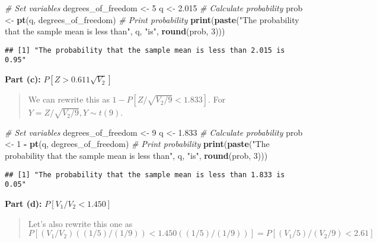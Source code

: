 \documentclass[
]{article}
\newenvironment{Shaded}{\begin{snugshade}}{\end{snugshade}}
\newcommand{\CommentTok}[1]{\textcolor[rgb]{0.56,0.35,0.01}{\textit{#1}}}
\newcommand{\DecValTok}[1]{\textcolor[rgb]{0.00,0.00,0.81}{#1}}
\newcommand{\FloatTok}[1]{\textcolor[rgb]{0.00,0.00,0.81}{#1}}
\newcommand{\FunctionTok}[1]{\textcolor[rgb]{0.13,0.29,0.53}{\textbf{#1}}}
\newcommand{\NormalTok}[1]{#1}
\newcommand{\OtherTok}[1]{\textcolor[rgb]{0.56,0.35,0.01}{#1}}
\newcommand{\SpecialCharTok}[1]{\textcolor[rgb]{0.81,0.36,0.00}{\textbf{#1}}}
\newcommand{\StringTok}[1]{\textcolor[rgb]{0.31,0.60,0.02}{#1}}
\begin{document}
\begin{Shaded}
\begin{Highlighting}[]
\CommentTok{\# Set variables}
\NormalTok{degrees\_of\_freedom }\OtherTok{\textless{}{-}} \DecValTok{5}
\NormalTok{q }\OtherTok{\textless{}{-}} \FloatTok{2.015}
\CommentTok{\# Calculate probability}
\NormalTok{prob }\OtherTok{\textless{}{-}} \FunctionTok{pt}\NormalTok{(q, degrees\_of\_freedom)}
\CommentTok{\# Print probability}
\FunctionTok{print}\NormalTok{(}\FunctionTok{paste}\NormalTok{(}\StringTok{"The probability that the sample mean is less than"}\NormalTok{, q, }\StringTok{"is"}\NormalTok{, }\FunctionTok{round}\NormalTok{(prob, }\DecValTok{3}\NormalTok{)))}
\end{Highlighting}
\end{Shaded}

\begin{verbatim}
## [1] "The probability that the sample mean is less than 2.015 is 0.95"
\end{verbatim}

\textbf{Part (c):} \(P[Z > 0.611 \sqrt{V_2}]\)

\begin{quote}
We can rewrite this as \(1 - P[Z/\sqrt{V_2/9} < 1.833]\). For
\(Y = Z/\sqrt{V_2/9}, Y \sim t(9)\).
\end{quote}

\begin{Shaded}
\begin{Highlighting}[]
\CommentTok{\# Set variables}
\NormalTok{degrees\_of\_freedom }\OtherTok{\textless{}{-}} \DecValTok{9}
\NormalTok{q }\OtherTok{\textless{}{-}} \FloatTok{1.833}
\CommentTok{\# Calculate probability}
\NormalTok{prob }\OtherTok{\textless{}{-}} \DecValTok{1} \SpecialCharTok{{-}} \FunctionTok{pt}\NormalTok{(q, degrees\_of\_freedom)}
\CommentTok{\# Print probability}
\FunctionTok{print}\NormalTok{(}\FunctionTok{paste}\NormalTok{(}\StringTok{"The probability that the sample mean is less than"}\NormalTok{, q, }\StringTok{"is"}\NormalTok{, }\FunctionTok{round}\NormalTok{(prob, }\DecValTok{3}\NormalTok{)))}
\end{Highlighting}
\end{Shaded}

\begin{verbatim}
## [1] "The probability that the sample mean is less than 1.833 is 0.05"
\end{verbatim}

\textbf{Part (d):} \(P[V_1/V_2 < 1.450]\)

\begin{quote}
Let's also rewrite this one as
\(P[(V_1/V_2) ((1/5)/(1/9)) < 1.450((1/5)/(1/9)) ] = P[(V_1/5)/(V_2/9) < 2.61 ]\)
\end{quote}
\end{document}
